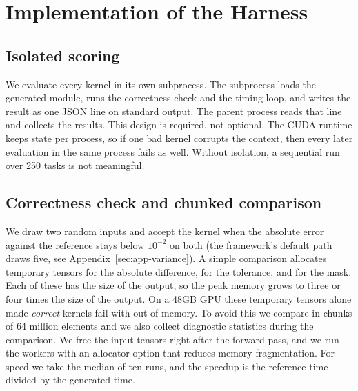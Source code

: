 
\section{Implementation of the Harness}

\subsection{Isolated scoring}
We evaluate every kernel in its own subprocess. The subprocess loads the generated module, runs the
correctness check and the timing loop, and writes the result as one JSON line on standard output.
The parent process reads that line and collects the results. This design is required, not optional.
The CUDA runtime keeps state per process, so if one bad kernel corrupts the context, then every
later evaluation in the same process fails as well. Without isolation, a sequential run over 250
tasks is not meaningful.

\subsection{Correctness check and chunked comparison}
We draw two random inputs and accept the kernel when the absolute error against the reference stays
below $10^{-2}$ on both (the framework's default path draws five, see Appendix~\ref{sec:app-variance}). A simple comparison allocates temporary tensors for the absolute difference, for
the tolerance, and for the mask. Each of these has the size of the output, so the peak memory grows
to three or four times the size of the output. On a 48GB GPU these temporary tensors alone made
\emph{correct} kernels fail with out of memory. To avoid this we compare in chunks of 64 million
elements and we also collect diagnostic statistics during the comparison. We free the input tensors
right after the forward pass, and we run the workers with an allocator option that reduces memory
fragmentation. For speed we take the median of ten runs, and the speedup is the reference time
divided by the generated time.

